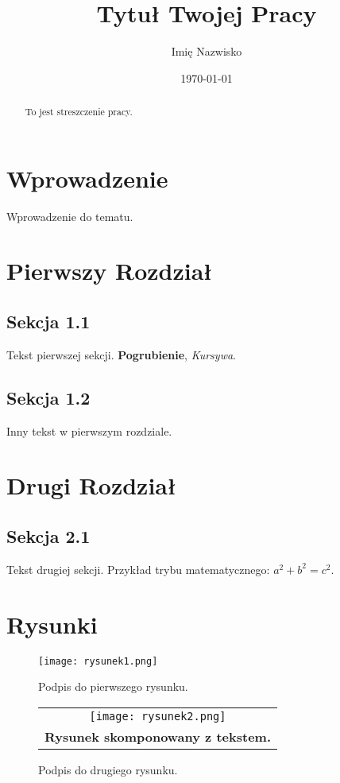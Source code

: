 \documentclass{article}
\title{Tytuł Twojej Pracy}
\author{Imię Nazwisko}
\date{\today}
\begin{document}
\maketitle

\begin{abstract}
    To jest streszczenie pracy. \lipsum[1]
\end{abstract}

\tableofcontents

\section{Wprowadzenie}
Wprowadzenie do tematu.

\section{Pierwszy Rozdział}
\subsection{Sekcja 1.1}
Tekst pierwszej sekcji. \textbf{Pogrubienie}, \textit{Kursywa}.

\subsection{Sekcja 1.2}
Inny tekst w pierwszym rozdziale.

\section{Drugi Rozdział}
\subsection{Sekcja 2.1}
Tekst drugiej sekcji. Przykład trybu matematycznego: $a^2 + b^2 = c^2$.

\section{Rysunki}
\begin{figure}[h]
    \centering
    \texttt{[image: rysunek1.png]}
    \caption{Podpis do pierwszego rysunku.}
    \label{sec:rysunek1}
\end{figure}

\begin{figure}[h]
    \centering
    \begin{tabular}{c}
        \texttt{[image: rysunek2.png]} \\
        \textbf{Rysunek skomponowany z tekstem.}
    \end{tabular}
    \caption{Podpis do drugiego rysunku.}
    \label{sec:rysunek2}
\end{figure}
\end{document}
